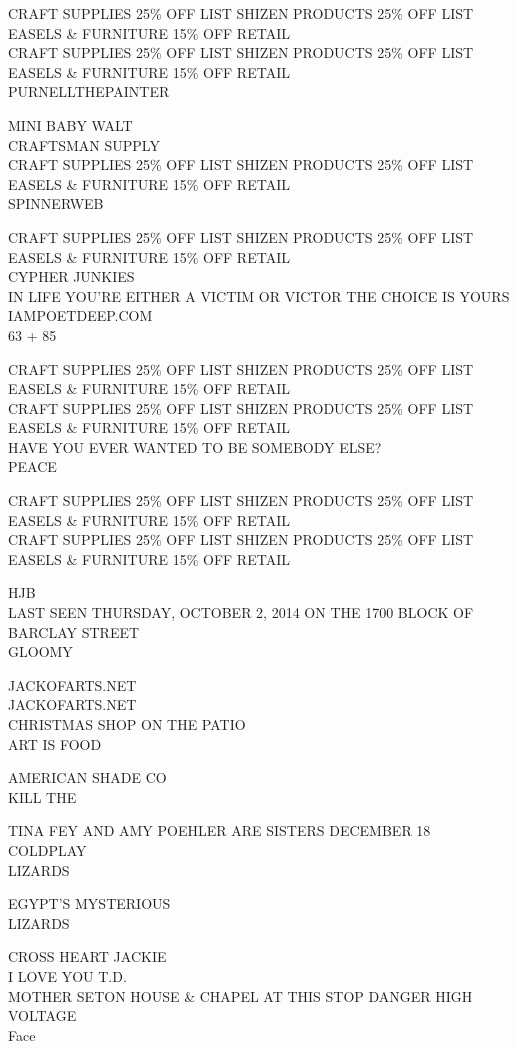 \documentclass[10pt,letterpaper]{article}
\begin{document}
CRAFT SUPPLIES 25\% OFF LIST SHIZEN PRODUCTS 25\% OFF LIST EASELS \& FURNITURE 15\% OFF RETAIL\\
CRAFT SUPPLIES 25\% OFF LIST SHIZEN PRODUCTS 25\% OFF LIST EASELS \& FURNITURE 15\% OFF RETAIL\\
PURNELLTHEPAINTER

MINI BABY WALT\\
CRAFTSMAN SUPPLY\\
CRAFT SUPPLIES 25\% OFF LIST SHIZEN PRODUCTS 25\% OFF LIST EASELS \& FURNITURE 15\% OFF RETAIL\\
SPINNERWEB

CRAFT SUPPLIES 25\% OFF LIST SHIZEN PRODUCTS 25\% OFF LIST EASELS \& FURNITURE 15\% OFF RETAIL\\
CYPHER JUNKIES\\
IN LIFE YOU'RE EITHER A VICTIM OR VICTOR THE CHOICE IS YOURS IAMPOETDEEP.COM\\
63 + 85

CRAFT SUPPLIES 25\% OFF LIST SHIZEN PRODUCTS 25\% OFF LIST EASELS \& FURNITURE 15\% OFF RETAIL\\
CRAFT SUPPLIES 25\% OFF LIST SHIZEN PRODUCTS 25\% OFF LIST EASELS \& FURNITURE 15\% OFF RETAIL\\
HAVE YOU EVER WANTED TO BE SOMEBODY ELSE?\\
PEACE

CRAFT SUPPLIES 25\% OFF LIST SHIZEN PRODUCTS 25\% OFF LIST EASELS \& FURNITURE 15\% OFF RETAIL\\
CRAFT SUPPLIES 25\% OFF LIST SHIZEN PRODUCTS 25\% OFF LIST EASELS \& FURNITURE 15\% OFF RETAIL

HJB\\
LAST SEEN THURSDAY, OCTOBER 2, 2014 ON THE 1700 BLOCK OF BARCLAY STREET\\
GLOOMY

JACKOFARTS.NET\\
JACKOFARTS.NET\\
CHRISTMAS SHOP ON THE PATIO\\
ART IS FOOD

AMERICAN SHADE CO\\
KILL THE

TINA FEY AND AMY POEHLER ARE SISTERS DECEMBER 18\\
COLDPLAY\\
LIZARDS

EGYPT'S MYSTERIOUS\\
LIZARDS

CROSS HEART JACKIE\\
I LOVE YOU T.D.\\
MOTHER SETON HOUSE \& CHAPEL AT THIS STOP DANGER HIGH VOLTAGE\\
Face
\end{document}
